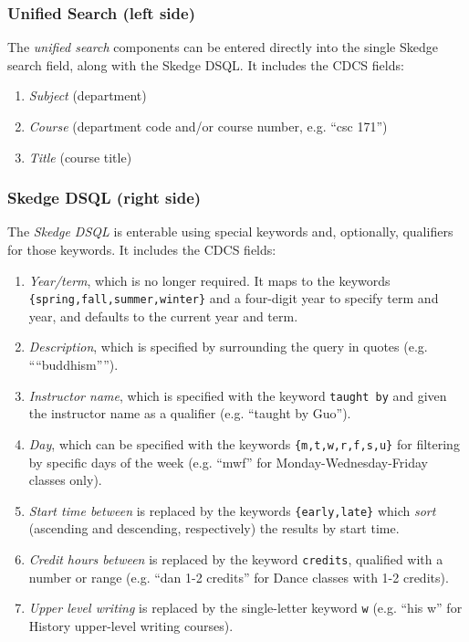 \subsubsection{Unified Search (left side)}

The \emph{unified search} components can be entered directly into the single Skedge search field, along with the Skedge DSQL. It includes the CDCS fields:

\begin{enumerate}
  \item \emph{Subject} (department)
  \item \emph{Course} (department code and/or course number, e.g. ``csc 171'')
  \item \emph{Title} (course title)
\end{enumerate}

\subsubsection{Skedge DSQL (right side)}

The \emph{Skedge DSQL} is enterable using special keywords and, optionally, qualifiers for those keywords. It includes the CDCS fields:

\begin{enumerate}
  \item \emph{Year/term}, which is no longer required. It maps to the keywords {\tt \{spring,fall,summer,winter\}} and a four-digit year to specify term and year, and defaults to the current year and term.

  \item \emph{Description}, which is specified by surrounding the query in quotes (e.g. ````buddhism'''').

  \item \emph{Instructor name}, which is specified with the keyword {\tt taught by} and given the instructor name as a qualifier (e.g. ``taught by Guo'').

  \item \emph{Day}, which can be specified with the keywords {\tt \{m,t,w,r,f,s,u\}} for filtering by specific days of the week (e.g. ``mwf'' for Monday-Wednesday-Friday classes only).

  \item \emph{Start time between} is replaced by the keywords {\tt \{early,late\}} which \emph{sort} (ascending and descending, respectively) the results by start time.

  \item \emph{Credit hours between} is replaced by the keyword {\tt credits}, qualified with a number or range (e.g. ``dan 1-2 credits'' for Dance classes with 1-2 credits).

  \item \emph{Upper level writing} is replaced by the single-letter keyword {\tt w} (e.g. ``his w'' for History upper-level writing courses).
\end{enumerate}

